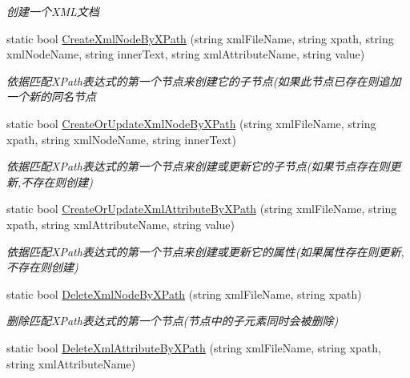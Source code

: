 \begin{DoxyCompactItemize}
\begin{DoxyCompactList}\small\item\em 创建一个\-X\-M\-L文档 \end{DoxyCompactList}\item 
static bool \hyperlink{class_x_c_l_net_tools_1_1_x_m_l_1_1_x_m_l_helper_a64172ca2312a41b7b64a31e3585e8bda}{Create\-Xml\-Node\-By\-X\-Path} (string xml\-File\-Name, string xpath, string xml\-Node\-Name, string inner\-Text, string xml\-Attribute\-Name, string value)
\begin{DoxyCompactList}\small\item\em 依据匹配\-X\-Path表达式的第一个节点来创建它的子节点(如果此节点已存在则追加一个新的同名节点 \end{DoxyCompactList}\item 
static bool \hyperlink{class_x_c_l_net_tools_1_1_x_m_l_1_1_x_m_l_helper_a770d2342df55e3a414830e1d1842dea8}{Create\-Or\-Update\-Xml\-Node\-By\-X\-Path} (string xml\-File\-Name, string xpath, string xml\-Node\-Name, string inner\-Text)
\begin{DoxyCompactList}\small\item\em 依据匹配\-X\-Path表达式的第一个节点来创建或更新它的子节点(如果节点存在则更新,不存在则创建) \end{DoxyCompactList}\item 
static bool \hyperlink{class_x_c_l_net_tools_1_1_x_m_l_1_1_x_m_l_helper_af784efe901d3b7ee6d6ffbcb2711f489}{Create\-Or\-Update\-Xml\-Attribute\-By\-X\-Path} (string xml\-File\-Name, string xpath, string xml\-Attribute\-Name, string value)
\begin{DoxyCompactList}\small\item\em 依据匹配\-X\-Path表达式的第一个节点来创建或更新它的属性(如果属性存在则更新,不存在则创建) \end{DoxyCompactList}\item 
static bool \hyperlink{class_x_c_l_net_tools_1_1_x_m_l_1_1_x_m_l_helper_a715f1e4b7ef5d9626ca4e1c7bd3ae460}{Delete\-Xml\-Node\-By\-X\-Path} (string xml\-File\-Name, string xpath)
\begin{DoxyCompactList}\small\item\em 删除匹配\-X\-Path表达式的第一个节点(节点中的子元素同时会被删除) \end{DoxyCompactList}\item 
static bool \hyperlink{class_x_c_l_net_tools_1_1_x_m_l_1_1_x_m_l_helper_a8907224fc217566b279babdbc2b14716}{Delete\-Xml\-Attribute\-By\-X\-Path} (string xml\-File\-Name, string xpath, string xml\-Attribute\-Name)

\end{DoxyCompactItemize}
